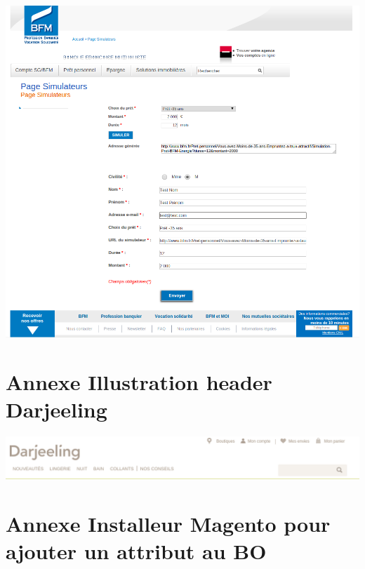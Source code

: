 \documentclass[a4paper,11pt,twoside]{report}
\begin{document}
  \begin{center}
    \includegraphics[width=\textwidth]{images/page_teleconseille3.png} 
    \label{page_teleconseille_formulaire_prerempli}
  \end{center}
  
    \newpage
    
  \section*{Annexe Illustration header Darjeeling}
  \begin{center}
      \includegraphics[width=\textwidth]{images/darjeeling_header.png} 
      \label{darjeeling_header}
  \end{center}
  
    \newpage
    
  \section*{Annexe Installeur Magento pour ajouter un attribut au BO}
  \label{installeur_Magento_pour_ajouter_un_attribut_au_BO}
  
  
\end{document}

